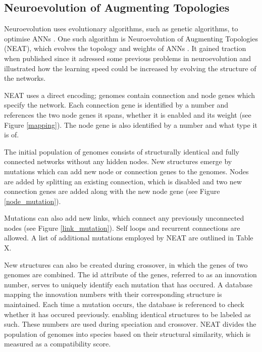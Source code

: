 \newpage

\subsection{Neuroevolution of Augmenting Topologies}
Neuroevolution uses evolutionary algorithms, such as genetic algorithms, to optimise ANNs \cite{neuroevolution_review}.
One such algorithm is Neuroevolution of Augmenting Topologies (NEAT), which evolves the topology and weights of ANNs \cite{neat_main}.
It gained traction when published since it adressed some previous problems in neuroevolution and illustrated how the learning speed could
be increased by evolving the structure of the networks.

NEAT uses a direct encoding; genomes contain connection and node genes which specify the network. Each connection gene is identified
by a number and references the two node genes it spans, whether it is enabled and its weight (see Figure \ref{mapping}). The node gene
is also identified by a number and what type it is of.



The initial population of genomes consists of structurally identical and fully connected networks without any hidden nodes.
New structures emerge by mutations which can add new node or connection genes to the genomes. Nodes are added by splitting an existing
connection, which is disabled and two new connection genes are added along with the new node gene (see Figure \ref{node_mutation}).



Mutations can also add new links, which connect any previously unconnected nodes (see Figure \ref{link_mutation}).
Self loops and recurrent connections are allowed. A list of additional mutations employed by NEAT are outlined in Table X.



New structures can also be created during crossover, in which the genes of two genomes are combined.
The id attribute of the genes, referred to as an innovation number, serves to uniquely identify each mutation that has occured.
A database mapping the innovation numbers with their corresponding structure is maintained. Each time a mutation occurs, the database
is referenced to check whether it has occured previously.
enabling identical structures to be labeled as such.
These numbers are used during speciation and crossover. NEAT divides the population of genomes into species based on their structural
similarity, which is measured as a compatibility score.



